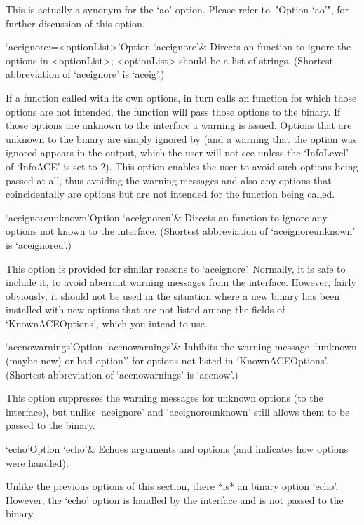 This  is  actually  a  synonym  for  the  `ao'  option.  Please  refer
to~"Option `ao'", for further discussion of this option.

\>`aceignore:=<optionList>'{Option `aceignore'}&
Directs an {\ACE} function to  ignore  the  options  in  <optionList>;
<optionList> should be a list of strings.
(Shortest abbreviation  of `aceignore' is `aceig'.)

If a function called with its own options, in  turn  calls  an  {\ACE}
function for which those options are not intended, the {\ACE} function
will pass those options to the {\ACE} binary.  If  those  options  are
unknown to the {\ACE} interface a warning is issued. Options that  are
unknown to the {\ACE} binary are  simply  ignored  by  {\ACE}  (and  a
warning that the option was ignored  appears  in  the  {\ACE}  output,
which the user will not see unless the `InfoLevel' of `InfoACE' is set
to 2). This option enables the user to avoid such options being passed
at all, thus avoiding the warning messages and also any  options  that
coincidentally are {\ACE} options but are not intended for the  {\ACE}
function being called.

\>`aceignoreunknown'{Option `aceignoreu'}&
Directs an {\ACE} function to  ignore  any  options  not known to the
{\ACE} interface.
(Shortest abbreviation  of `aceignoreunknown' is `aceignoreu'.)

This option is provided for similar reasons to `aceignore'.  Normally,
it is safe to include it, to avoid aberrant warning messages from  the
{\ACE} interface. However, fairly obviously, it should not be used  in
the situation where a new {\ACE} binary has been  installed  with  new
options that are not listed among  the  fields  of  `KnownACEOptions',
which you intend to use.

\>`acenowarnings'{Option `acenowarnings'}& 
Inhibits the warning message \lq{}`unknown (maybe new) or bad option''
for options not listed in `KnownACEOptions'.
(Shortest abbreviation  of `acenowarnings' is `acenow'.)

This option suppresses the warning messages for  unknown  options  (to
the {\ACE} interface), but unlike `aceignore'  and  `aceignoreunknown'
still allows them to be passed to the {\ACE} binary.

\>`echo'{Option `echo'}& 
Echoes arguments and options (and indicates how options were handled).

Unlike the previous options of this  section,  there  *is*  an  {\ACE}
binary option `echo'. However, the `echo' option  is  handled  by  the
{\ACE} interface and is not passed to the {\ACE} binary.

